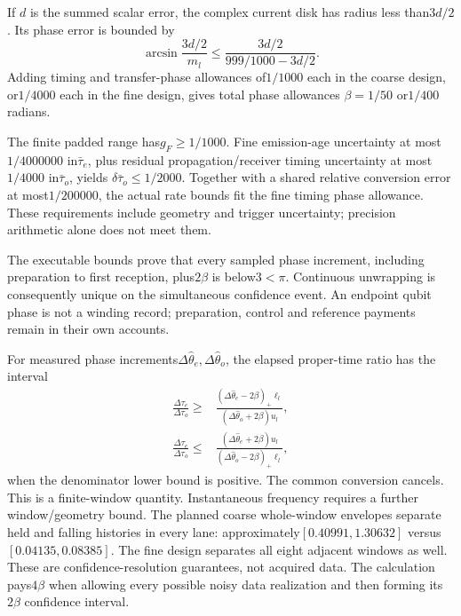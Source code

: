 \documentclass[10pt,twocolumn,letterpaper]{article}
\begin{document}
If $d$ is the summed scalar error, the complex current disk has radius
less than$3d/2$. Its phase error is bounded by
\[
 \arcsin\frac{3d/2}{m_l}
 \le\frac{3d/2}{999/1000-3d/2}.
\]
Adding timing and transfer-phase allowances of$1/1000$ each in the coarse
design, or$1/4000$ each in the fine design, gives total phase allowances
$\beta=1/50$ or$1/400$ radians.

The finite padded range has$g_F\ge1/1000$. Fine emission-age uncertainty
at most$1/4000000$ in$\bar\tau_e$, plus residual propagation/receiver timing
uncertainty at most$1/4000$ in$\bar\tau_o$, yields
$\delta\bar\tau_o\le1/2000$. Together with a shared relative conversion
error at most$1/200000$, the actual rate bounds fit the fine timing phase
allowance. These requirements include geometry and trigger uncertainty;
precision arithmetic alone does not meet them.

The executable bounds prove that every sampled phase increment, including
preparation to first reception, plus$2\beta$ is below$3<\pi$. Continuous
unwrapping is consequently unique on the simultaneous confidence event.
An endpoint qubit phase is not a winding record; preparation, control and
reference payments remain in their own accounts.

For measured phase increments$\Delta\hat\theta_e,\Delta\hat\theta_o$,
the elapsed proper-time ratio has the interval
\[
 \begin{aligned}
 \frac{\Delta\tau_e}{\Delta\tau_o}\ge{}&
 \frac{(\Delta\hat\theta_e-2\beta)_+\ell_l}
      {(\Delta\hat\theta_o+2\beta)u_l},\\
 \frac{\Delta\tau_e}{\Delta\tau_o}\le{}&
 \frac{(\Delta\hat\theta_e+2\beta)u_l}
      {(\Delta\hat\theta_o-2\beta)_+\ell_l},
 \end{aligned}
\]
when the denominator lower bound is positive. The common conversion cancels.
This is a finite-window quantity. Instantaneous frequency requires a further
window/geometry bound. The planned coarse whole-window envelopes separate
held and falling histories in every lane: approximately$[0.40991,1.30632]$
versus$[0.04135,0.08385]$. The fine design separates all eight adjacent
windows as well. These are confidence-resolution guarantees, not acquired
data. The calculation pays$4\beta$ when allowing every possible noisy data
realization and then forming its$2\beta$ confidence interval.
\end{document}
